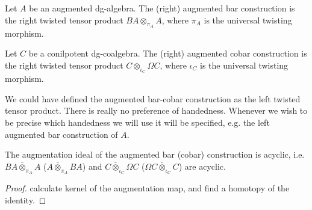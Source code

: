 \documentclass[../thesis.tex]{subfiles}
\begin{document}
            \begin{definition}
                Let $A$ be an augmented dg-algebra. The (right) augmented bar construction is the right twisted tensor product $BA \otimes_{\pi_A} A$, where $\pi_A$ is the universal twisting morphism.

                Let $C$ be a conilpotent dg-coalgebra. The (right) augmented cobar construction is the right twisted tensor product $C \otimes_{\iota_C} \Omega C$, where $\iota_C$ is the universal twisting morphism.
            \end{definition}

            \begin{remark}
                We could have defined the augmented bar-cobar construction as the left twisted tensor product. There is really no preference of handedness. Whenever we wish to be precise which handedness we will use it will be specified, e.g. the left augmented bar construction of $A$.
            \end{remark}

            \begin{proposition}\label{prop: aug-bar-ac}
                The augmentation ideal of the augmented bar (cobar) construction is acyclic, i.e. $BA \bar{\otimes}_{\pi_A} A$ ($A \bar{\otimes}_{\pi_A} BA$) and $C \bar{\otimes}_{\iota_C}\Omega C$ ($\Omega C \bar{\otimes}_{\iota_C} C$) are acyclic.
            \end{proposition}

            \begin{proof}
                calculate kernel of the augmentation map, and find a homotopy of the identity.
            \end{proof}


        
\end{document}
